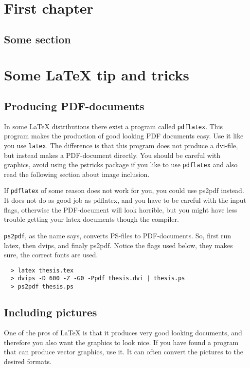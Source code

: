 \chapter{First chapter}

\section{Some section}




\chapter{Some {\LaTeX} tip and tricks}

\section{Producing PDF-documents}

In some LaTeX distributions there exist a program called
\texttt{pdflatex}. This program makes the production of good looking PDF 
documents easy. Use it like you use \texttt{latex}. The difference is that
this program does not produce a dvi-file, but instead makes a
PDF-document directly. You should be careful with graphics, avoid
using the pstricks package if you like to use \texttt{pdflatex} and also
read the following section about image inclusion.

If \texttt{pdflatex} of some reason does not work for you, you could use
ps2pdf instead. It does not do as good job as pdflatex, and
you have to be careful with the input flags, otherwise the
PDF-document will look horrible, but you might have less trouble
getting your latex documents though the compiler.

\texttt{ps2pdf}, as the name says, converts PS-files to PDF-documents. So,
first run latex, then dvips, and finaly ps2pdf. Notice the flags
used below, they makes sure, the correct fonts are used. 
\begin{verbatim}
  > latex thesis.tex
  > dvips -D 600 -Z -G0 -Ppdf thesis.dvi | thesis.ps
  > ps2pdf thesis.ps
\end{verbatim}

\section{Including pictures}

One of the pros of {\LaTeX} is that it produces very good looking
documents, and therefore you also want the graphics to look nice. If
you have found a program that can produce vector graphics, use
it. It can often convert the pictures to the desired formats. 

